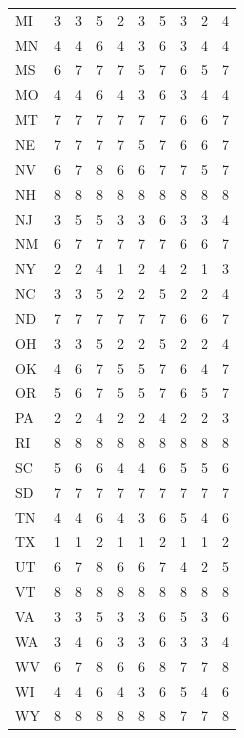 \documentclass{article}
\begin{document}
\begin{table}[H]
\begin{tabular}{l*{9}{c}}
MI & 3 & 3 & 5 & 2 & 3 & 5 & 3 & 2 & 4 \\
MN & 4 & 4 & 6 & 4 & 3 & 6 & 3 & 4 & 4 \\
MS & 6 & 7 & 7 & 7 & 5 & 7 & 6 & 5 & 7 \\
MO & 4 & 4 & 6 & 4 & 3 & 6 & 3 & 4 & 4 \\
MT & 7 & 7 & 7 & 7 & 7 & 7 & 6 & 6 & 7 \\
NE & 7 & 7 & 7 & 7 & 5 & 7 & 6 & 6 & 7 \\
NV & 6 & 7 & 8 & 6 & 6 & 7 & 7 & 5 & 7 \\
NH & 8 & 8 & 8 & 8 & 8 & 8 & 8 & 8 & 8 \\
NJ & 3 & 5 & 5 & 3 & 3 & 6 & 3 & 3 & 4 \\
NM & 6 & 7 & 7 & 7 & 7 & 7 & 6 & 6 & 7 \\
NY & 2 & 2 & 4 & 1 & 2 & 4 & 2 & 1 & 3 \\
NC & 3 & 3 & 5 & 2 & 2 & 5 & 2 & 2 & 4 \\
ND & 7 & 7 & 7 & 7 & 7 & 7 & 6 & 6 & 7 \\
OH & 3 & 3 & 5 & 2 & 2 & 5 & 2 & 2 & 4 \\
OK & 4 & 6 & 7 & 5 & 5 & 7 & 6 & 4 & 7 \\
OR & 5 & 6 & 7 & 5 & 5 & 7 & 6 & 5 & 7 \\
PA & 2 & 2 & 4 & 2 & 2 & 4 & 2 & 2 & 3 \\
RI & 8 & 8 & 8 & 8 & 8 & 8 & 8 & 8 & 8 \\
SC & 5 & 6 & 6 & 4 & 4 & 6 & 5 & 5 & 6 \\
SD & 7 & 7 & 7 & 7 & 7 & 7 & 7 & 7 & 7 \\
TN & 4 & 4 & 6 & 4 & 3 & 6 & 5 & 4 & 6 \\
TX & 1 & 1 & 2 & 1 & 1 & 2 & 1 & 1 & 2 \\
UT & 6 & 7 & 8 & 6 & 6 & 7 & 4 & 2 & 5 \\
VT & 8 & 8 & 8 & 8 & 8 & 8 & 8 & 8 & 8 \\
VA & 3 & 3 & 5 & 3 & 3 & 6 & 5 & 3 & 6 \\
WA & 3 & 4 & 6 & 3 & 3 & 6 & 3 & 3 & 4 \\
WV & 6 & 7 & 8 & 6 & 6 & 8 & 7 & 7 & 8 \\
WI & 4 & 4 & 6 & 4 & 3 & 6 & 5 & 4 & 6 \\
WY & 8 & 8 & 8 & 8 & 8 & 8 & 7 & 7 & 8 \\
\bottomrule
\end{tabular}
\end{table}
\end{document}

